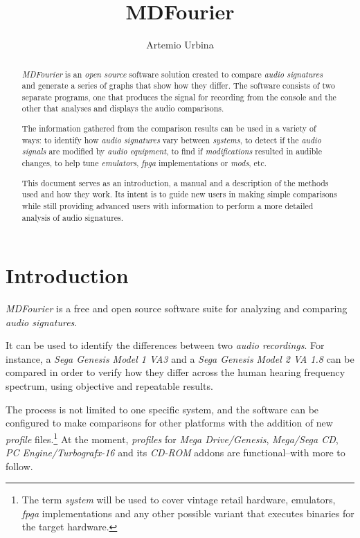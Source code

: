 \documentclass[10pt,a4paper]{report}
\title{MDFourier}
\author{Artemio Urbina}
\newcommand{\ac}[1]{\textit{\mbox{\acrshort{#1}}}}
\begin{document}
	
\begin{titlepage}
	\maketitle
	\thispagestyle{empty}
\end{titlepage}

\begin{abstract}
\textit{MDFourier} is an \textit{open source} software solution created to compare \textit{audio signatures} and generate a series of graphs that show how they differ. The software consists of two separate programs, one that produces the signal for recording from the console and the other that analyses and displays the audio comparisons. 

The information gathered from the comparison results can be used in a variety of ways: to identify how \textit{audio signatures} vary between \textit{systems}, to detect if the \textit{audio signals} are modified by \textit{audio equipment}, to find if \textit{modifications} resulted in audible changes, to help tune \textit{emulators}, \ac{fpga} implementations or \textit{mods}, etc.

This document serves as an introduction, a manual and a description of the methods used and how they work. Its intent is to guide new users in making simple comparisons while still providing advanced users with information to perform a more detailed analysis of audio signatures.
\end{abstract}

\tableofcontents

\chapter{Introduction}

\textit{MDFourier} is a free and open source software suite for analyzing and comparing \textit{audio signatures}.

It can be used to identify the differences between two \textit{audio recordings}. For instance, a \textit{Sega Genesis Model 1 VA3} and a \textit{Sega Genesis Model 2 VA 1.8} can be compared in order to verify how they differ across the human hearing frequency spectrum, using objective and repeatable results.

The process is not limited to one specific system, and the software can be configured to make comparisons for other platforms with the addition of new \textit{profile} files.\footnote{The term \textit{system} will be used to cover vintage retail hardware, emulators, \ac{fpga} implementations and any other possible variant that executes binaries for the target hardware.} At the moment, \textit{profiles} for \textit{Mega Drive/Genesis}, \textit{Mega/Sega CD}, \textit{PC Engine/Turbografx-16} and its \textit{CD-ROM} addons are functional--with more to follow.
\end{document}
